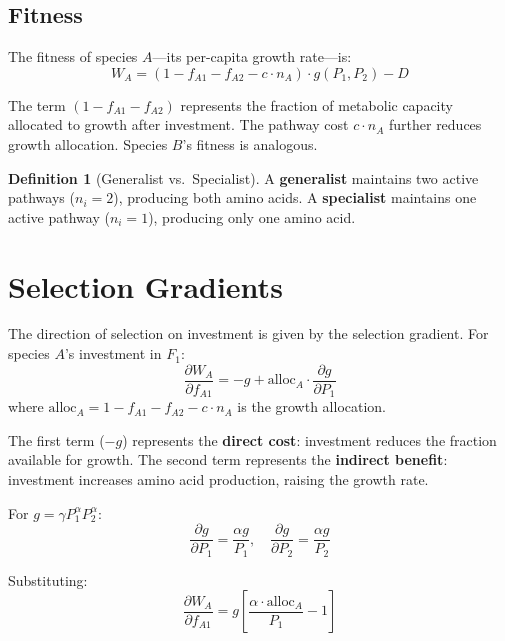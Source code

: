 \documentclass[11pt]{article}
\theoremstyle{definition}
\newtheorem{definition}{Definition}
\newcommand{\pd}[2]{\frac{\partial #1}{\partial #2}}
\begin{document}
\subsection{Fitness}

The fitness of species $A$---its per-capita growth rate---is:
\begin{equation}
W_A = \left(1 - f_{A1} - f_{A2} - c \cdot n_A\right) \cdot g(P_1, P_2) - D
\label{eq:fitness}
\end{equation}

The term $(1 - f_{A1} - f_{A2})$ represents the fraction of metabolic capacity allocated to growth after investment. The pathway cost $c \cdot n_A$ further reduces growth allocation. Species $B$'s fitness is analogous.

\begin{definition}[Generalist vs.\ Specialist]
A \textbf{generalist} maintains two active pathways ($n_i = 2$), producing both amino acids. A \textbf{specialist} maintains one active pathway ($n_i = 1$), producing only one amino acid.
\end{definition}

\section{Selection Gradients}

The direction of selection on investment is given by the selection gradient. For species $A$'s investment in $F_1$:
\begin{equation}
\pd{W_A}{f_{A1}} = -g + \text{alloc}_A \cdot \pd{g}{P_1}
\label{eq:gradient}
\end{equation}
where $\text{alloc}_A = 1 - f_{A1} - f_{A2} - c \cdot n_A$ is the growth allocation.

The first term ($-g$) represents the \textbf{direct cost}: investment reduces the fraction available for growth. The second term represents the \textbf{indirect benefit}: investment increases amino acid production, raising the growth rate.

For $g = \gamma P_1^\alpha P_2^\alpha$:
\begin{equation}
\pd{g}{P_1} = \frac{\alpha g}{P_1}, \quad \pd{g}{P_2} = \frac{\alpha g}{P_2}
\label{eq:dg}
\end{equation}

Substituting:
\begin{equation}
\pd{W_A}{f_{A1}} = g \left[\frac{\alpha \cdot \text{alloc}_A}{P_1} - 1\right]
\label{eq:grad_explicit}
\end{equation}
\end{document}
